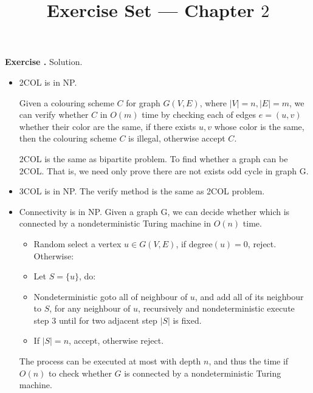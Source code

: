 \documentclass[a4paper]{article}
\title{Exercise Set --- Chapter $2$}
\date{}
\newenvironment{exercise}[1]{
	\par
	\noindent\textbf{Exercise #1.}\quad
}{
	\par
	\bigskip
}
\begin{document}
\maketitle

\begin{exercise}{2.2}
\textbf{Solution.}
\begin{itemize}
\item 2COL is in NP.

Given a colouring scheme $C$ for graph $G(V,E)$, where $|V| = n, |E| = m$, we can verify whether $C$ in $O(m)$ time by checking each of edges $e = (u,v)$ whether their color are the same, if there exists $u,v$ whose color is the same, then the colouring scheme $C$ is illegal, otherwise accept $C$.

2COL is the same as bipartite problem. To find whether a graph can be 2COL. That is, we need only prove there are not exists odd cycle in graph G.
\item 3COL is in NP. The verify method is the same as 2COL problem.
\item Connectivity is in NP. 
Given a graph G, we can decide whether which is connected by a nondeterministic Turing machine in $O(n)$ time.
\begin{itemize}
\item Random select a vertex $u\in G(V,E)$, if degree$(u) = 0$, reject. Otherwise:
\item Let $S = \{u\}$, do:
\item \quad Nondeterministic goto all of neighbour of $u$, and add all of its neighbour to $S$, for any neighbour of $u$, recursively and nondeterministic execute step 3 until for two adjacent step $|S|$ is fixed. 
\item If $|S| = n$, accept, otherwise reject. 
\end{itemize}
The process can be executed at most with depth $n$, and thus the time if $O(n)$ to check whether $G$ is connected by a nondeterministic Turing machine.
\end{itemize}


\end{exercise}
\end{document}
